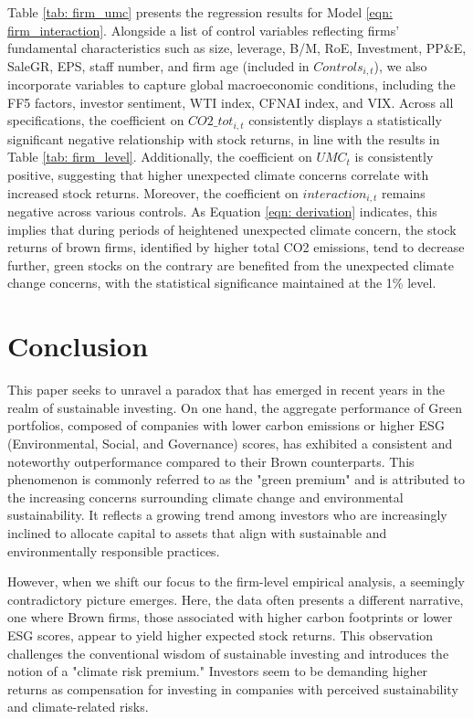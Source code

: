 \documentclass[12pt]{article}
\begin{document}
Table \ref{tab: firm_umc} presents the regression results for Model \ref{eqn: firm_interaction}. Alongside a list of control variables reflecting firms' fundamental characteristics such as size, leverage, B/M, RoE, Investment, PP\&E, SaleGR, EPS, staff number, and firm age (included in $Controls_{i, t}$), we also incorporate variables to capture global macroeconomic conditions, including the FF5 factors, investor sentiment, WTI index, CFNAI index, and VIX. Across all specifications, the coefficient on $CO2\_tot_{i,t}$ consistently displays a statistically significant negative relationship with stock returns, in line with the results in Table \ref{tab: firm_level}. Additionally, the coefficient on $UMC_t$ is consistently positive, suggesting that higher unexpected climate concerns correlate with increased stock returns. Moreover, the coefficient on $interaction_{i,t}$ remains negative across various controls. As Equation \ref{eqn: derivation} indicates, this implies that during periods of heightened unexpected climate concern, the stock returns of brown firms, identified by higher total CO2 emissions, tend to decrease further, green stocks on the contrary are benefited from the unexpected climate change concerns, with the statistical significance maintained at the 1\% level.

\section{Conclusion} \label{sec:conclusion}

This paper seeks to unravel a paradox that has emerged in recent years in the realm of sustainable investing. On one hand, the aggregate performance of Green portfolios, composed of companies with lower carbon emissions or higher ESG (Environmental, Social, and Governance) scores, has exhibited a consistent and noteworthy outperformance compared to their Brown counterparts. This phenomenon is commonly referred to as the "green premium" and is attributed to the increasing concerns surrounding climate change and environmental sustainability. It reflects a growing trend among investors who are increasingly inclined to allocate capital to assets that align with sustainable and environmentally responsible practices.

However, when we shift our focus to the firm-level empirical analysis, a seemingly contradictory picture emerges. Here, the data often presents a different narrative, one where Brown firms, those associated with higher carbon footprints or lower ESG scores, appear to yield higher expected stock returns. This observation challenges the conventional wisdom of sustainable investing and introduces the notion of a "climate risk premium." Investors seem to be demanding higher returns as compensation for investing in companies with perceived sustainability and climate-related risks.
\end{document}
